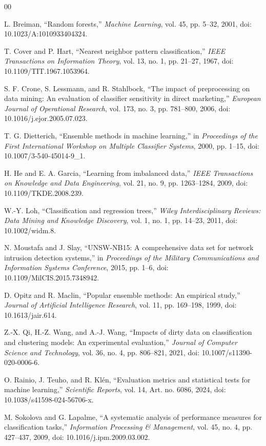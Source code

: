 \documentclass[conference]{IEEEtran}
\begin{document}
\begin{thebibliography}{00}

L. Breiman, ``Random forests,'' \emph{Machine Learning}, vol. 45, pp. 5--32, 2001, doi: 10.1023/A:1010933404324.

T. Cover and P. Hart, ``Nearest neighbor pattern classification,'' \emph{IEEE Transactions on Information Theory}, vol. 13, no. 1, pp. 21--27, 1967, doi: 10.1109/TIT.1967.1053964.

S. F. Crone, S. Lessmann, and R. Stahlbock, ``The impact of preprocessing on data mining: An evaluation of classifier sensitivity in direct marketing,'' \emph{European Journal of Operational Research}, vol. 173, no. 3, pp. 781--800, 2006, doi: 10.1016/j.ejor.2005.07.023.

T. G. Dietterich, ``Ensemble methods in machine learning,'' in \emph{Proceedings of the First International Workshop on Multiple Classifier Systems}, 2000, pp. 1--15, doi: 10.1007/3-540-45014-9\_1.

H. He and E. A. Garcia, ``Learning from imbalanced data,'' \emph{IEEE Transactions on Knowledge and Data Engineering}, vol. 21, no. 9, pp. 1263--1284, 2009, doi: 10.1109/TKDE.2008.239.

W.-Y. Loh, ``Classification and regression trees,'' \emph{Wiley Interdisciplinary Reviews: Data Mining and Knowledge Discovery}, vol. 1, no. 1, pp. 14--23, 2011, doi: 10.1002/widm.8.

N. Moustafa and J. Slay, ``UNSW-NB15: A comprehensive data set for network intrusion detection systems,'' in \emph{Proceedings of the Military Communications and Information Systems Conference}, 2015, pp. 1--6, doi: 10.1109/MilCIS.2015.7348942.

D. Opitz and R. Maclin, ``Popular ensemble methods: An empirical study,'' \emph{Journal of Artificial Intelligence Research}, vol. 11, pp. 169--198, 1999, doi: 10.1613/jair.614.

Z.-X. Qi, H.-Z. Wang, and A.-J. Wang, ``Impacts of dirty data on classification and clustering models: An experimental evaluation,'' \emph{Journal of Computer Science and Technology}, vol. 36, no. 4, pp. 806--821, 2021, doi: 10.1007/s11390-020-0006-6.

O. Rainio, J. Teuho, and R. Kl\'{e}n, ``Evaluation metrics and statistical tests for machine learning,'' \emph{Scientific Reports}, vol. 14, Art. no. 6086, 2024, doi: 10.1038/s41598-024-56706-x.

M. Sokolova and G. Lapalme, ``A systematic analysis of performance measures for classification tasks,'' \emph{Information Processing \& Management}, vol. 45, no. 4, pp. 427--437, 2009, doi: 10.1016/j.ipm.2009.03.002.

\end{thebibliography}
\end{document}
